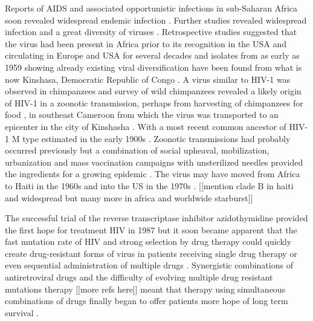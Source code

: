 \documentclass[../sherrill-Mix_thesis.tex]{subfiles}
\begin{document}
	Reports of AIDS and associated opportunistic infections in sub-Saharan Africa soon revealed widespread endemic infection \citep{Clumeck1983,Clumeck1984,VandePerre1984,Piot1984}. Further studies revealed widespread infection and a great diversity of viruses \citep{Nkengasong1994,Louwagie1995,Vidal2000,Rambaut2001,Yang2001,Kalish2004}. Retrospective studies suggested that the virus had been present in Africa prior to its recognition in the USA \citep{Bygbjerg1983,Vandepitte1983,Clumeck1984} and circulating in Europe and USA for several decades \citep{Froland1988,Garry1988} and isolates from as early as 1959 showing already existing viral diversification have been found from what is now Kinshasa, Democratic Republic of Congo \citep{Nahmias1986,Zhu1998,Worobey2008}. A virus similar to HIV-1 was observed in chimpanzees \citep{Peeters1989,Huet1990} and survey of wild chimpanzees revealed a likely origin of HIV-1 in a zoonotic transmission, perhaps from harvesting of chimpanzees for food \citep{Bowen-Jones1999,Hahn2000,Peeters2002,Wolfe2004,Wolfe2005,Kalish2005}, in southeast Cameroon \citep{Gao1999,Keele2006,VanHeuverswyn2007} from which the virus was transported to an epicenter in the city of Kinshasha \citep{Vidal2000,Vangroenweghe2001,Worobey2008,Sharp2008,Faria2014}. With a most recent common ancestor of HIV-1 M type estimated in the early 1900s \citep{Korber2000,Salemi2001,Sharp2001,Yusim2001,Worobey2008,Faria2014}. Zoonotic transmissions had probably occurred previously but a combination of social upheaval, mobilization, urbanization and mass vaccination campaigns with unsterilized needles provided the ingredients for a growing epidemic \citep{Chitnis2000,deSousa2010,deSousa2012,Faria2014}. The virus may have moved from Africa to Haiti in the 1960s and into the US in the 1970s \citep{Gilbert2007}. [[mention clade B in haiti and widespread but many more in africa and worldwide starburst]]


	The successful trial of the reverse transcriptase inhibitor azidothymidine provided the first hope for treatment HIV in 1987 \citep{Fischl1987,Fischl1989,Volberding1990} but it soon became apparent that the fast mutation rate of HIV \citep{Hahn1986,Preston1988,Roberts1988,Mansky1995,Mansky1996,Abram2010,Achuthan2014} and strong selection by drug therapy could quickly create drug-resistant forms of virus in patients receiving single drug therapy \citep{Larder1989,Larder1989a,Land1990,Boucher1990,Richman1990,Richman1991,Fitzgibbon1992,Richman1994,Schuurman1995,Schmit1996} or even sequential administration of multiple drugs \citep{Kahn1992,Abrams1994,deJong1994,Schmit1996a}. Synergistic combinations of antiretroviral drugs \citep{Dornsife1991,Johnson1991,Cox1994,Feng2009,Jilek2012,Kulkarni2014} and the difficulty of evolving multiple drug resistant mutations therapy \citep{Chow1993,Larder1995} [[more refs here]] meant that therapy using simultaneous combinations of drugs finally began to offer patients more hope of long term survival \citep{Collier1993,Eron1995,Collier1996,Hammer1996,Saravolatz1996,Darbyshire1996,Hammer1997,Gulick1997,Moore1999}.
\end{document}
